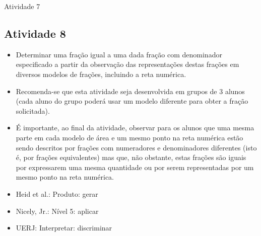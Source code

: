 \begin{multicols}{2}
\begin{resposta*}{Atividade 7}

\end{resposta*}

\Bg
\Bg

\subsection{Atividade 8}

\begin{itemize} %
    \item       Determinar uma fração igual a uma dada fração com denominador
especificado a partir da observação das representações destas frações em
diversos modelos de frações, incluindo a reta numérica.
\end{itemize} %


\begin{itemize} %
    \item       Recomenda-se que esta atividade seja desenvolvida em grupos de 3
alunos (cada aluno do grupo poderá usar um modelo diferente para obter a fração
solicitada).
    \item       É importante, ao final da atividade, observar para os alunos que
uma mesma parte em cada modelo de área e um mesmo ponto na reta numérica estão
sendo descritos por frações com numeradores e denominadores diferentes (isto é,
por frações equivalentes) mas que, não obstante, estas frações são iguais por
expressarem uma mesma quantidade ou por serem representadas por um mesmo ponto
na reta numérica.
\end{itemize} %

   \vspace{.1cm}

 \vspace{.1cm}

\begin{itemize} %
    \item       Heid et al.: Produto: gerar
    \item       Nicely, Jr.: Nível 5: aplicar
    \item       UERJ: Interpretar: discriminar
\end{itemize} %


\end{multicols}
